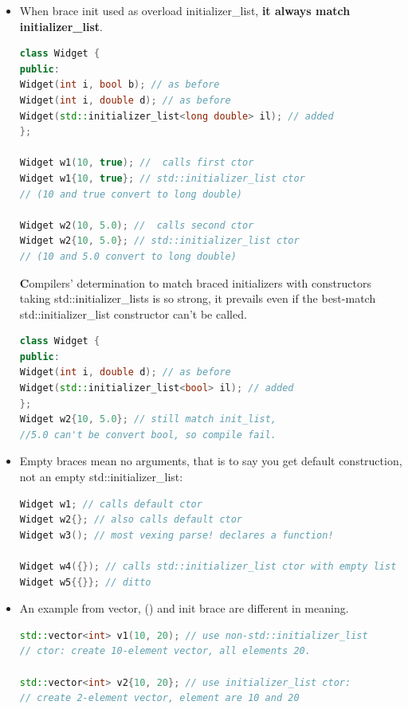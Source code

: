 \documentclass[a4paper,12pt,twoside]{book}
\begin{document}
\begin{itemize}
\item When brace init used as overload initializer\_list, \textbf{it always match initializer\_list}.
\begin{lstlisting}[frame=single, language=c++,mathescape=true]
class Widget {
public:
Widget(int i, bool b); // as before
Widget(int i, double d); // as before
Widget(std::initializer_list<long double> il); // added
};

Widget w1(10, true); //  calls first ctor
Widget w1{10, true}; // std::initializer_list ctor
// (10 and true convert to long double)

Widget w2(10, 5.0); //  calls second ctor
Widget w2{10, 5.0}; // std::initializer_list ctor
// (10 and 5.0 convert to long double)
\end{lstlisting}
\textbf Compilers' determination to match braced initializers with constructors taking std::initializer\_lists is so strong, it prevails even if the best-match std::initializer\_list constructor can't be called.
\begin{lstlisting}[frame=single, language=c++,mathescape=true]
class Widget {
public:
Widget(int i, double d); // as before
Widget(std::initializer_list<bool> il); // added
};
Widget w2{10, 5.0}; // still match init_list,
//5.0 can't be convert bool, so compile fail.
\end{lstlisting}

\item Empty braces mean no arguments, that is to say you get default construction, not an empty std::initializer\_list:
\begin{lstlisting}[frame=single, language=c++,mathescape=true]
Widget w1; // calls default ctor
Widget w2{}; // also calls default ctor
Widget w3(); // most vexing parse! declares a function!

Widget w4({}); // calls std::initializer_list ctor with empty list
Widget w5{{}}; // ditto
\end{lstlisting}

\item An example from vector, () and init brace are different in meaning.
\begin{lstlisting}[frame=single, language=c++,mathescape=true]
std::vector<int> v1(10, 20); // use non-std::initializer_list
// ctor: create 10-element vector, all elements 20.

std::vector<int> v2{10, 20}; // use initializer_list ctor:
// create 2-element vector, element are 10 and 20
\end{lstlisting}


\end{itemize}
\end{document}
